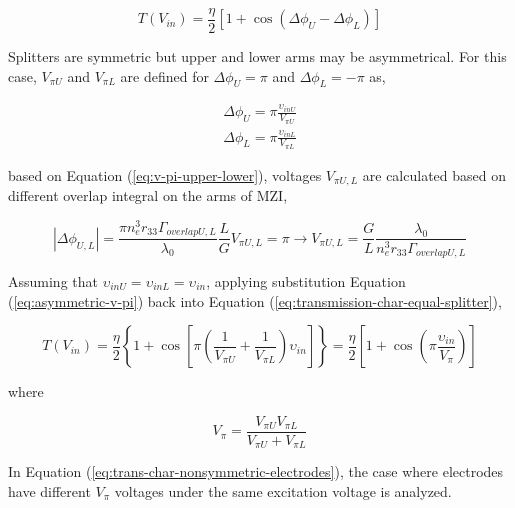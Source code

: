 \documentclass[thesis]{deutez}
\begin{document}
    \begin{equation}
        T(V_{in}) = \frac{\eta}{2} \left[ 1+\cos(\Delta\phi_U - \Delta\phi_L) \right] 
        \label{eq:transmission-char-equal-splitter} 
    \end{equation}

    Splitters are symmetric but upper and lower arms may be asymmetrical. For this case, $V_{\pi U}$ and $V_{\pi L}$ are defined for $\Delta\phi_U = \pi$ and $\Delta\phi_L = -\pi$ as,

    \begin{subequations}\label{eq:v-pi-upper-lower}
        \begin{align}
            \Delta\phi_U = \pi \frac{\upsilon_{inU}}{V_{\pi U}} \label{eq:eq:v-pi-upper} \\
            \Delta\phi_L = \pi \frac{\upsilon_{inL}}{V_{\pi L}} \label{eq:v-pi-lower}
        \end{align}
    \end{subequations}

    based on Equation (\ref{eq:v-pi-upper-lower}), voltages $V_{\pi U,L}$ are calculated based on different overlap integral on the arms of MZI,
     
    \begin{equation}
        |\Delta\phi_{U,L}| = \frac{\pi n_e^3 r_{33}\Gamma_{overlapU,L}}{\lambda_0}\frac{L}{G}V_{\pi U,L} = \pi \rightarrow V_{\pi U,L} = \frac{G}{L}\frac{\lambda_0}{n_e^3 r_{33}\Gamma_{overlapU,L}}
        \label{eq:asymmetric-v-pi}
    \end{equation}

    Assuming that $\upsilon_{inU}=\upsilon_{inL}=\upsilon_{in}$, applying substitution Equation (\ref{eq:asymmetric-v-pi}) back into Equation (\ref{eq:transmission-char-equal-splitter}),  

    \begin{equation}
        T(V_{in}) = \frac{\eta}{2} \left\{ 1+\cos \left[\pi \left( \frac{1}{V_{\pi U}}+\frac{1}{V_{\pi L}} \right) \upsilon_{in} \right] \right\} = \frac{\eta}{2} \left[ 1+\cos(\pi \frac{\upsilon_{in}}{V_\pi}) \right] 
        \label{eq:trans-char-nonsymmetric-electrodes} 
    \end{equation}

    where 

    \begin{equation}
        V_\pi = \frac{V_{\pi U}V_{\pi L}}{V_{\pi U}+V_{\pi L}}
    \end{equation}
    
    In Equation (\ref{eq:trans-char-nonsymmetric-electrodes}), the case where electrodes have different $V_{\pi}$ voltages under the same excitation voltage is analyzed.
\end{document}
